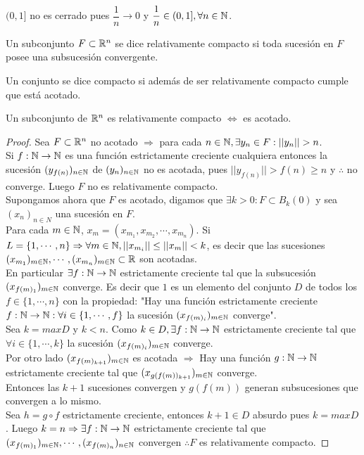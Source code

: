 \begin{eg}
  $(0, 1]$ no es cerrado pues $\dfrac{1}{n} \to 0$ y $\dfrac{1}{n} \in (0, 1], \forall n \in \mathbb{N}$.
\end{eg}

\begin{definition}
  Un subconjunto $F \subset \mathbb{R}^n$ se dice relativamente compacto si toda sucesión en $F$ posee una subsucesión convergente.
\end{definition}

\begin{definition}[Compacto]
  Un conjunto se dice compacto si además de ser relativamente compacto cumple que está acotado.
\end{definition}

\begin{prop}
  Un subconjunto de $\mathbb{R}^n$ es relativamente compacto $\iff$ es acotado.
  \begin{proof}
    Sea $F \subset \mathbb{R}^n$ no acotado $\Rightarrow$ para cada $n \in \mathbb{N}, \exists y_n \in F : ||y_n|| > n$. \\
    Si $f : \mathbb{N} \to \mathbb{N}$ es una función estrictamente creciente cualquiera entonces la sucesión $(y_{f(n)})_{n \in \mathbb{N}}$ de $(y_n)_{n \in \mathbb{N}}$ no es acotada, pues $||y_{f(n)}|| > f(n) \geq n$ y $\therefore$ no converge. Luego $F$ no es relativamente compacto. \\

    Supongamos ahora que $F$ es acotado, digamos que $\exists k > 0 : F \subset B_k(0)$ y sea $(x_n)_{n \in N}$ una sucesión en $F$. \\
    Para cada $m \in \mathbb{N}$, $x_m = (x_{m_1}, x_{m_2}, \cdots, x_{m_n})$. Si $L = \{1, \cdots, n\} \Rightarrow \forall m \in \mathbb{N}, ||x_{m_i}|| \leq ||x_m|| < k$, es decir que las sucesiones $(x_{m_1})_{m \in \mathbb{N}}, \cdots, (x_{m_n})_{m \in \mathbb{N}} \subset \mathbb{R}$ son acotadas. \\
    En particular $\exists f: \mathbb{N} \to \mathbb{N}$ estrictamente creciente tal que la subsucesión $(x_{f(m)_1})_{m \in \mathbb{N}}$ converge. Es decir que $1$ es un elemento del conjunto $D$ de todos los $f \in \{1, \cdots, n\}$ con la propiedad: "Hay una función estrictamente creciente $f: \mathbb{N} \to \mathbb{N} : \forall i \in \{1, \cdots, f\}$ la sucesión $(x_{f(m)_i})_{m \in \mathbb{N}}$ converge". \\
    Sea $k = maxD$ y $k < n$. Como $k \in D, \exists f: \mathbb{N} \to \mathbb{N}$ estrictamente creciente tal que $\forall i \in \{1, \cdots, k\}$ la sucesión $(x_{f(m)_i})_{m \in \mathbb{N}}$ converge. \\
    Por otro lado $(x_{f(m)_{k+1}})_{m \in \mathbb{N}}$ es acotada $\Rightarrow$ Hay una función $g: \mathbb{N} \to \mathbb{N}$ estrictamente creciente tal que $(x_{g(f(m))_{k+1}})_{m \in \mathbb{N}}$ converge. \\
    Entonces las $k+1$ sucesiones convergen y $g(f(m))$ generan subsucesiones que convergen a lo mismo. \\
    Sea $h = g \circ f$ estrictamente creciente, entonces $k+1 \in D$ absurdo pues $k = maxD$. Luego $k = n \Rightarrow \exists f: \mathbb{N} \to \mathbb{N}$ estrictamente creciente tal que \\
    $(x_{f(m)_1})_{m \in \mathbb{N}}, \cdots, (x_{f(m)_n})_{n \in \mathbb{N}}$ convergen $\therefore F$ es relativamente compacto.
  \end{proof}
\end{prop}
